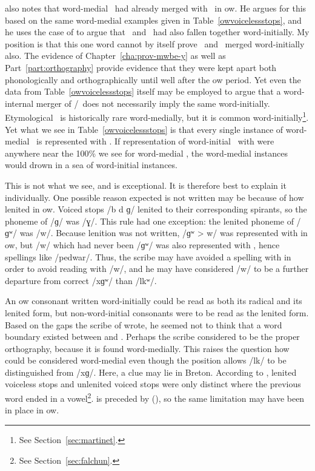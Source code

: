 \Textcite{Sch_Two01} also notes that word-medial \xD\ had already merged with \lT\ in \gls{ow}. He argues for this based on the same word-medial examples given in Table~\ref{owvoicelessstops}, and he uses the case of  to argue that \lT\ and \xD\ had also fallen together word-initially. My position is that this one word cannot by itself prove  \xD\ and \lT\ merged word-initially also. The evidence of Chapter~\ref{cha:prov-mwbe-y} as well as Part~\ref{part:orthography} provide evidence that they were kept apart both phonologically and orthographically until well after the \gls{ow} period. Yet even the data from Table~\ref{owvoicelessstops} itself may be employed to argue that a word-internal merger of \xD/\lT\ does not necessarily imply the same word-initially. Etymological \xD\ is historically rare word-medially, but it is common word-initially\footnote{See Section~\ref{sec:martinet}.}. Yet what we see in Table~\ref{owvoicelessstops} is that every single instance of word-medial \xD\ is represented with . If representation of word-initial \xD\ with  were anywhere near the 100\% we see for word-medial \xD, the word-medial instances would drown in a sea of word-initial instances. 

This is not what we see, and  is exceptional. It is therefore best to explain it individually. One possible reason expected  is not written may be because of how  lenited in \gls{ow}. Voiced stops /b d ɡ/ lenited to their corresponding spirants, so the phoneme of /ɡ/ was /ɣ/. This rule had one exception: the lenited phoneme of /ɡʷ/ was /w/. Because lenition was not written, /ɡʷ > w/ was represented with  in \gls{ow}, but /w/ which had never been /ɡʷ/ was also represented with , hence spellings like  /pedwar/. Thus, the scribe may have avoided a spelling with  in order to avoid reading with /w/, and he may have considered /w/ to be a further departure from correct /\gls{x}ɡʷ/ than /\gls{l}kʷ/.

An \gls{ow} consonant written word-initially could be read as both its radical and its  lenited form, but non-word-initial consonants were to be read as the lenited form. Based on the gaps the scribe of  wrote, he seemed not to think that a word boundary existed between  and . Perhaps the scribe considered  to be the proper orthography, because it is found word-medially. This raises the question how  could be considered word-medial even though the position allows /\gls{l}k/ to be distinguished from /\gls{x}ɡ/. Here, a clue may lie in Breton. According to \textcite[64]{falchun_systeme_1951}, lenited voiceless stops and unlenited voiced stops were only distinct where the previous word ended in a vowel\footnote{See Section~\ref{sec:falchun}.}.  is preceded by  (), so the same limitation may have been in place in \gls{ow}.





